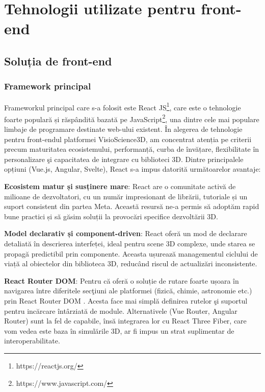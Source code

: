 \chapter{Tehnologii utilizate pentru front-end}
\label{chapter:tehnologii}

\label{sec:proj}
\section{Soluția de front-end}
\subsection{Framework principal}

Frameworkul principal care s-a folosit este React JS\footnote{https://reactjs.org/}, care este o tehnologie foarte populară
și răspândită bazată pe JavaScript\footnote{https://www.javascript.com/}, una dintre cele mai populare limbaje de programare destinate
web-ului existent.
În alegerea de tehnologie pentru front-endul platformei VisioScience3D,
am concentrat atenția pe criterii precum maturitatea ecosistemului, performanță, curba de învățare,
flexibilitate în personalizare şi capacitatea de integrare cu biblioteci 3D. Dintre principalele
opțiuni (Vue.js, Angular, Svelte), React s-a impus datorită următoarelor avantaje:

\textbf{Ecosistem matur și susținere mare}:
  React are o comunitate activă de milioane de dezvoltatori,
  cu un număr impresionant de librării, tutoriale și un suport consistent din partea Meta. 
  Această resursă ne-a permis să adoptăm rapid bune practici și să găsim soluții la provocări 
  specifice dezvoltării 3D.

\textbf{Model declarativ și component-driven}:
  React oferă un mod de declarare detaliată în descrierea interfeței, ideal pentru scene 3D
  complexe, unde starea se propagă predictibil prin componente. Aceasta ușurează managementul 
  ciclului de viață al obiectelor din biblioteca 3D, reducând riscul de actualizări inconsistente.

\textbf{React Router DOM}:
  Pentru că oferă o soluție de rutare foarte ușoara în navigarea între diferitele
  secţiuni ale platformei (fizică, chimie, astronomie etc.) prin React Router DOM .
  Acesta face mai simplă definirea rutelor şi suportul pentru incărcare întârziată de module.
  Alternativele (Vue Router, Angular Router) sunt la fel de capabile, însă integrarea lor cu
  React Three Fiber, care vom vedea este baza în simulările 3D, ar fi impus un strat suplimentar
  de interoperabilitate.


